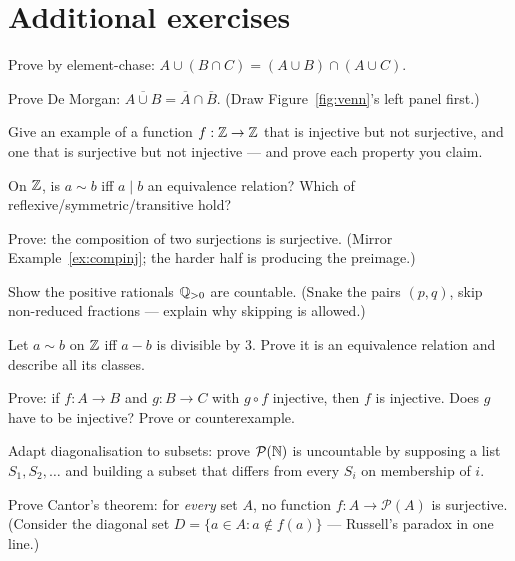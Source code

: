 \section{Additional exercises}
\begin{exercise}[easy]
Prove by element-chase: $A \cup (B \cap C) = (A \cup B) \cap (A \cup C)$.
\end{exercise}
\begin{exercise}[easy]
Prove De Morgan: $\overline{A \cup B} = \overline{A} \cap \overline{B}$.
(Draw Figure~\ref{fig:venn}'s left panel first.)
\end{exercise}
\begin{exercise}[easy]
Give an example of a function $f : \mathbb{Z} \to \mathbb{Z}$ that is injective but not
surjective, and one that is surjective but not injective --- and prove each
property you claim.
\end{exercise}
\begin{exercise}[easy]
On $\mathbb{Z}$, is $a \sim b$ iff $a \mid b$ an equivalence relation? Which of
reflexive/symmetric/transitive hold?
\end{exercise}
\begin{exercise}[medium]
Prove: the composition of two surjections is surjective. (Mirror
Example~\ref{ex:compinj}; the harder half is producing the preimage.)
\end{exercise}
\begin{exercise}[medium]
Show the positive rationals $\mathbb{Q}_{>0}$ are countable. (Snake the pairs
$(p,q)$, skip non-reduced fractions --- explain why skipping is allowed.)
\end{exercise}
\begin{exercise}[medium]
Let $a \sim b$ on $\mathbb{Z}$ iff $a - b$ is divisible by $3$. Prove it is an
equivalence relation and describe all its classes.
\end{exercise}
\begin{exercise}[medium]
Prove: if $f : A \to B$ and $g : B \to C$ with $g \circ f$ injective, then
$f$ is injective. Does $g$ have to be injective? Prove or counterexample.
\end{exercise}
\begin{exercise}[hard]
Adapt diagonalisation to subsets: prove $\mathcal{P}(\mathbb{N})$ is uncountable by
supposing a list $S_1, S_2, \dots$ and building a subset that differs from
every $S_i$ on membership of $i$.
\end{exercise}
\begin{exercise}[hard]
Prove Cantor's theorem: for \emph{every} set $A$, no function
$f : A \to \mathcal{P}(A)$ is surjective. (Consider the diagonal set
$D = \{a \in A : a \notin f(a)\}$ --- Russell's paradox in one line.)
\end{exercise}
